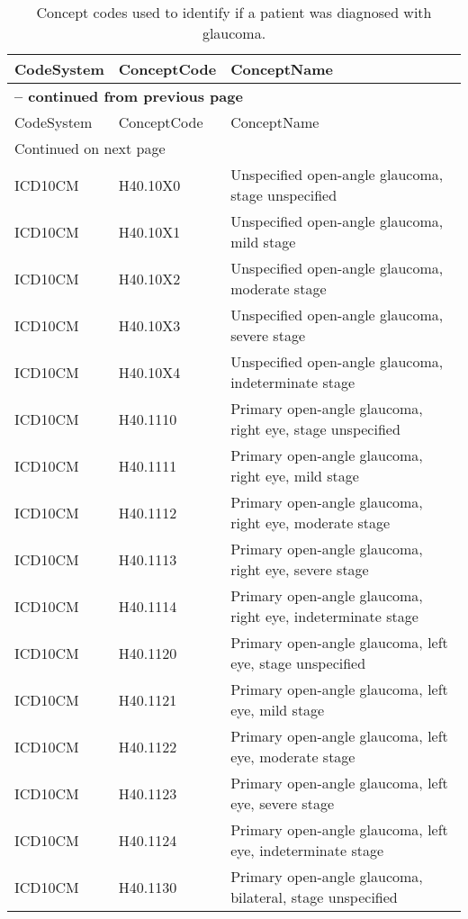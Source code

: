 \begin{longtable}{p{}p{}p{}}
\caption{Concept codes used to identify if a patient was diagnosed with glaucoma.} \\ 
 CodeSystem & ConceptCode & ConceptName \\ 
  \hline 
\endfirsthead 
\multicolumn{3}{p{\textwidth}}{{ \bfseries \tablename \thetable{} -- continued from previous page}} \\ 
\hline CodeSystem & ConceptCode & ConceptName \\ \hline 
\endhead 
\hline \multicolumn{3}{p{\textwidth}}{{Continued on next page}} \\ \hline 
\endfoot 
\hline 
\endlastfoot 
 \hline
ICD10CM & H40.10X0 & Unspecified open-angle glaucoma, stage unspecified \\ 
  ICD10CM & H40.10X1 & Unspecified open-angle glaucoma, mild stage \\ 
  ICD10CM & H40.10X2 & Unspecified open-angle glaucoma, moderate stage \\ 
  ICD10CM & H40.10X3 & Unspecified open-angle glaucoma, severe stage \\ 
  ICD10CM & H40.10X4 & Unspecified open-angle glaucoma, indeterminate stage \\ 
  ICD10CM & H40.1110 & Primary open-angle glaucoma, right eye, stage unspecified \\ 
  ICD10CM & H40.1111 & Primary open-angle glaucoma, right eye, mild stage \\ 
  ICD10CM & H40.1112 & Primary open-angle glaucoma, right eye, moderate stage \\ 
  ICD10CM & H40.1113 & Primary open-angle glaucoma, right eye, severe stage \\ 
  ICD10CM & H40.1114 & Primary open-angle glaucoma, right eye, indeterminate stage \\ 
  ICD10CM & H40.1120 & Primary open-angle glaucoma, left eye, stage unspecified \\ 
  ICD10CM & H40.1121 & Primary open-angle glaucoma, left eye, mild stage \\ 
  ICD10CM & H40.1122 & Primary open-angle glaucoma, left eye, moderate stage \\ 
  ICD10CM & H40.1123 & Primary open-angle glaucoma, left eye, severe stage \\ 
  ICD10CM & H40.1124 & Primary open-angle glaucoma, left eye, indeterminate stage \\ 
  ICD10CM & H40.1130 & Primary open-angle glaucoma, bilateral, stage unspecified \\ 

\end{longtable}

